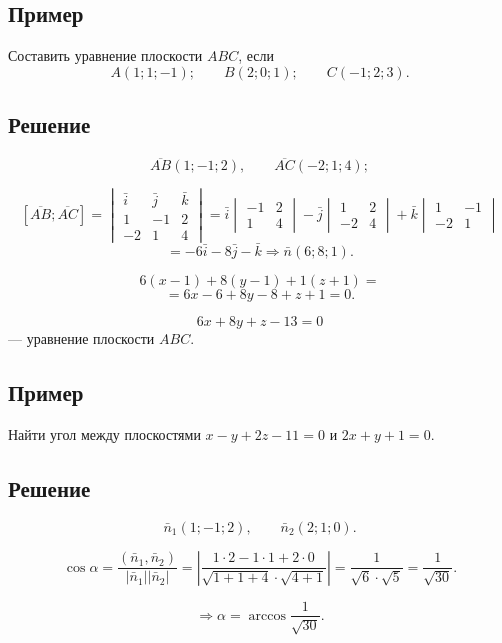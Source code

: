 \documentclass[12pt,a4paper]{article}
\newcommand{\vn}{\bar n}
\newcommand{\vi}{\bar i}
\newcommand{\vj}{\bar j}
\newcommand{\vk}{\bar k}
\begin{document}
\subsection*{\textbf{Пример}}

Составить уравнение плоскости $ABC$, если
$$
A(1;1;-1);\qquad B(2;0;1);\qquad C(-1;2;3).
$$

\subsection*{\textbf{Решение}}

$$
\overline{AB}(1;-1;2),\qquad \overline{AC}(-2;1;4);
$$

$$
[\overline{AB};\overline{AC}]=
\begin{vmatrix}
\vi & \vj & \vk\\
1 & -1 & 2\\
-2 & 1 & 4
\end{vmatrix}
=
\vi
\begin{vmatrix}-1&2\\1&4
\end{vmatrix}
-\vj
\begin{vmatrix}1&2\\-2&4
\end{vmatrix}
+\vk
\begin{vmatrix}1&-1\\-2&1
\end{vmatrix}
$$
$$
=-6\vi-8\vj-\vk\Rightarrow \vn(6;8;1).
$$

$$
6(x-1)+8(y-1)+1(z+1)=
$$
$$
=6x-6+8y-8+z+1=0.
$$

$$
6x+8y+z-13=0
$$
--- уравнение плоскости $ABC$.

\subsection*{\textbf{Пример}}

Найти угол между плоскостями $x-y+2z-11=0$ и $2x+y+1=0$.

\subsection*{\textbf{Решение}}

$$
\vn_1(1;-1;2),\qquad \vn_2(2;1;0).
$$

$$
\cos\alpha=
\frac{(\vn_1,\vn_2)}{|\vn_1||\vn_2|}
=
\left|
\frac{1\cdot2-1\cdot1+2\cdot0}{\sqrt{1+1+4}\cdot\sqrt{4+1}}
\right|
=
\frac1{\sqrt6\cdot\sqrt5}
=
\frac1{\sqrt{30}}.
$$

$$
\Rightarrow \alpha=\arccos\frac1{\sqrt{30}}.
$$
\end{document}
